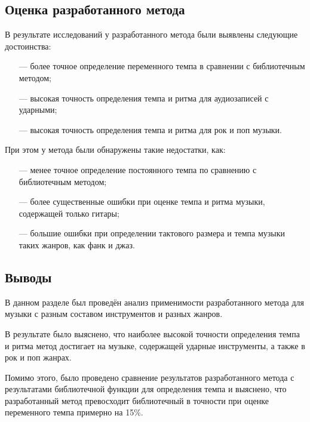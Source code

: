 \subsection{Оценка разработанного метода}

В результате исследований у разработанного метода были выявлены следующие достоинства:

\begin{itemize}
	\item[---] более точное определение переменного темпа в сравнении с библиотечным методом;
	\item[---] высокая точность определения темпа и ритма для аудиозаписей с ударными;
	\item[---] высокая точность определения темпа и ритма для рок и поп музыки.
\end{itemize}

При этом у метода были обнаружены такие недостатки, как:

\begin{itemize}
	\item[---] менее точное определение постоянного темпа по сравнению с библиотечным методом;
	\item[---] более существенные ошибки при оценке темпа и ритма музыки, содержащей только гитары;
	\item[---] большие ошибки при определении тактового размера и темпа музыки таких жанров, как фанк и джаз.
\end{itemize}

\subsection*{Выводы}
В данном разделе был проведён анализ применимости разработанного метода для музыки с разным составом инструментов и разных жанров. 

В результате было выяснено, что наиболее высокой точности определения темпа и ритма метод достигает на музыке, содержащей ударные инструменты, а также в рок и поп жанрах.

Помимо этого, было проведено сравнение результатов разработанного метода с результатами библиотечной функции для определения темпа и выяснено, что разработанный метод превосходит библиотечный в точности при оценке переменного темпа примерно на 15\%.